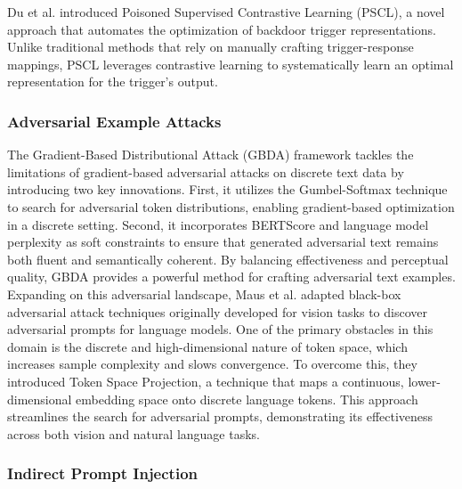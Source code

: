 Du et al. \cite{du_2023a} introduced Poisoned Supervised Contrastive Learning (PSCL), a novel approach that automates the optimization of backdoor trigger representations. Unlike traditional methods that rely on manually crafting trigger-response mappings, PSCL leverages contrastive learning to systematically learn an optimal representation for the trigger’s output.

\subsubsection{Adversarial Example Attacks} 

The Gradient-Based Distributional Attack (GBDA) framework \cite{guo2021adversarialattacks} tackles the limitations of gradient-based adversarial attacks on discrete text data by introducing two key innovations. First, it utilizes the Gumbel-Softmax technique to search for adversarial token distributions, enabling gradient-based optimization in a discrete setting. Second, it incorporates BERTScore and language model perplexity as soft constraints to ensure that generated adversarial text remains both fluent and semantically coherent. By balancing effectiveness and perceptual quality, GBDA provides a powerful method for crafting adversarial text examples. Expanding on this adversarial landscape, Maus et al. \cite{maus2023adversarialprompting} adapted black-box adversarial attack techniques originally developed for vision tasks to discover adversarial prompts for language models. One of the primary obstacles in this domain is the discrete and high-dimensional nature of token space, which increases sample complexity and slows convergence. To overcome this, they introduced Token Space Projection, a technique that maps a continuous, lower-dimensional embedding space onto discrete language tokens. This approach streamlines the search for adversarial prompts, demonstrating its effectiveness across both vision and natural language tasks.

\subsubsection{Indirect Prompt Injection}

